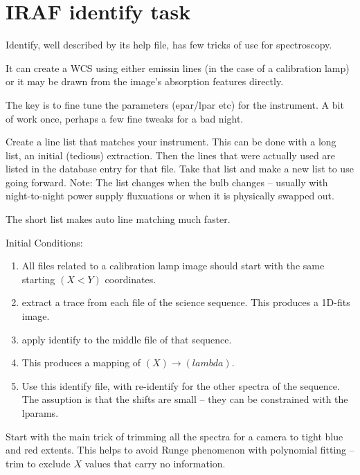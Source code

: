 
\renewcommand{\footerfilename}{identify.tex}

\section{IRAF identify task}

Identify, well described by its help file, has few tricks of use for spectroscopy.

It can create a WCS using either emissin lines (in the case of a calibration lamp)
or it may be drawn from the image's absorption features directly.

The key is to fine tune the parameters (epar/lpar etc) for the instrument. A bit of
work once, perhaps a few fine tweaks for a bad night.

Create a line list that matches your instrument. This can be done with a long list,
an initial (tedious) extraction. Then the lines that were actually used are listed
in the database entry for that file. Take that list and make a new list to use going
forward. Note: The list changes when the bulb changes -- usually with night-to-night
power supply fluxuations or when it is physically swapped out.

The short list makes auto line matching much faster.


Initial Conditions:

\vspace{-.15cm}
\begin{enumerate}\addtolength{\itemsep}{-0.5\baselineskip}
   \item   All files related to a calibration lamp image should start with the same starting
   $(X<Y)$ coordinates.
   \item   extract a trace from each file of the science sequence. This produces a 1D-fits image.
   \item   apply identify to the middle file of that sequence.
   \item   This produces a mapping of $(X) \rightarrow (lambda)$. 
   \item   Use this identify file, with re-identify for the other spectra of the sequence. The
     assuption is that the shifts are small -- they can be constrained with the lparams.
\end{enumerate}



Start with the main trick of trimming all the spectra for a camera to tight blue
and red extents.  This helps to avoid Runge phenomenon with polynomial
fitting -- trim to exclude $X$ values that carry no information.

